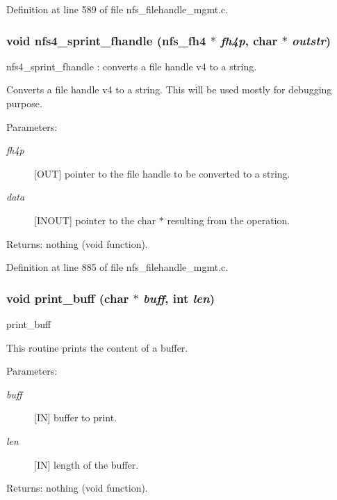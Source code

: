 Definition at line 589 of file nfs\_\-filehandle\_\-mgmt.c.
\subsubsection{\setlength{\rightskip}{0pt plus 5cm}void nfs4\_\-sprint\_\-fhandle (nfs\_\-fh4 $\ast$ {\em fh4p}, char $\ast$ {\em outstr})}\label{nfs__filehandle__mgmt_8c_a27}


nfs4\_\-sprint\_\-fhandle : converts a file handle v4 to a string.

Converts a file handle v4 to a string. This will be used mostly for debugging purpose.

\begin{Desc}
\item[Parameters:]
\begin{description}
\item[{\em fh4p}][OUT] pointer to the file handle to be converted to a string. \item[{\em data}][INOUT] pointer to the char $\ast$ resulting from the operation.\end{description}
\end{Desc}
\begin{Desc}
\item[Returns:]nothing (void function). \end{Desc}


Definition at line 885 of file nfs\_\-filehandle\_\-mgmt.c.
\subsubsection{\setlength{\rightskip}{0pt plus 5cm}void print\_\-buff (char $\ast$ {\em buff}, int {\em len})}\label{nfs__filehandle__mgmt_8c_a24}


print\_\-buff

This routine prints the content of a buffer.

\begin{Desc}
\item[Parameters:]
\begin{description}
\item[{\em buff}][IN] buffer to print. \item[{\em len}][IN] length of the buffer.\end{description}
\end{Desc}
\begin{Desc}
\item[Returns:]nothing (void function). \end{Desc}


